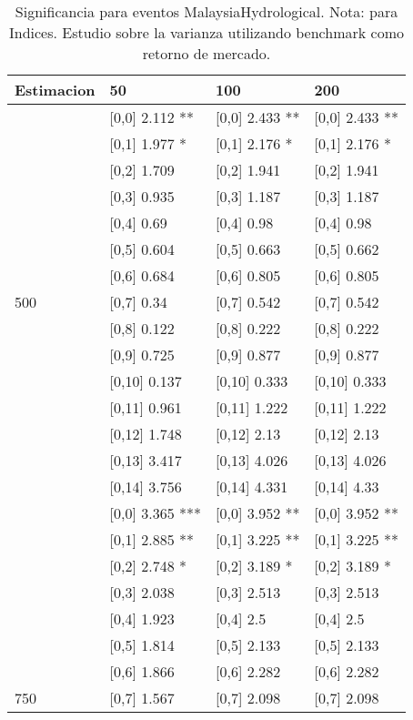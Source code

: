 \begin{table}

\caption{Significancia para eventos MalaysiaHydrological. Nota: para Indices. Estudio sobre la varianza utilizando benchmark como retorno de mercado.}
\centering
\begin{tabular}[t]{llll}
\toprule
Estimacion & 50 & 100 & 200\\
\midrule
 & {}[0,0] 2.112 ** & {}[0,0] 2.433 ** & {}[0,0] 2.433 **\\
 & {}[0,1] 1.977 * & {}[0,1] 2.176 * & {}[0,1] 2.176 *\\
 & {}[0,2] 1.709 & {}[0,2] 1.941 & {}[0,2] 1.941\\
 & {}[0,3] 0.935 & {}[0,3] 1.187 & {}[0,3] 1.187\\
 & {}[0,4] 0.69 & {}[0,4] 0.98 & {}[0,4] 0.98\\
\addlinespace
 & {}[0,5] 0.604 & {}[0,5] 0.663 & {}[0,5] 0.662\\
 & {}[0,6] 0.684 & {}[0,6] 0.805 & {}[0,6] 0.805\\
500 & {}[0,7] 0.34 & {}[0,7] 0.542 & {}[0,7] 0.542\\
 & {}[0,8] 0.122 & {}[0,8] 0.222 & {}[0,8] 0.222\\
 & {}[0,9] 0.725 & {}[0,9] 0.877 & {}[0,9] 0.877\\
\addlinespace
 & {}[0,10] 0.137 & {}[0,10] 0.333 & {}[0,10] 0.333\\
 & {}[0,11] 0.961 & {}[0,11] 1.222 & {}[0,11] 1.222\\
 & {}[0,12] 1.748 & {}[0,12] 2.13 & {}[0,12] 2.13\\
 & {}[0,13] 3.417 & {}[0,13] 4.026 & {}[0,13] 4.026\\
 & {}[0,14] 3.756 & {}[0,14] 4.331 & {}[0,14] 4.33\\
\addlinespace
 & {}[0,0] 3.365 *** & {}[0,0] 3.952 ** & {}[0,0] 3.952 **\\
 & {}[0,1] 2.885 ** & {}[0,1] 3.225 ** & {}[0,1] 3.225 **\\
 & {}[0,2] 2.748 * & {}[0,2] 3.189 * & {}[0,2] 3.189 *\\
 & {}[0,3] 2.038 & {}[0,3] 2.513 & {}[0,3] 2.513\\
 & {}[0,4] 1.923 & {}[0,4] 2.5 & {}[0,4] 2.5\\
\addlinespace
 & {}[0,5] 1.814 & {}[0,5] 2.133 & {}[0,5] 2.133\\
 & {}[0,6] 1.866 & {}[0,6] 2.282 & {}[0,6] 2.282\\
750 & {}[0,7] 1.567 & {}[0,7] 2.098 & {}[0,7] 2.098\\

\end{tabular}
\end{table}
